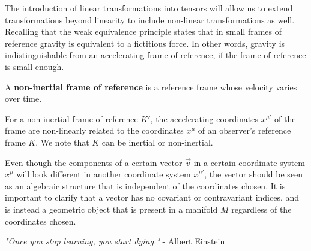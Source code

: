 \documentclass{article}
\begin{document}
 		The introduction of linear transformations into tensors will allow us to extend transformations beyond linearity to include non-linear transformations as well. Recalling that the weak equivalence principle states that in small frames of reference gravity is equivalent to a fictitious force. In other words, gravity is indistinguishable from an accelerating frame of reference, if the frame of reference is small enough.
 		\begin{defn}
 			A \textbf{non-inertial frame of reference} is a reference frame whose velocity varies over time.
 		\end{defn}
 		\begin{thm}
 			For a non-inertial frame of reference $K'$, the accelerating coordinates $x^{\mu'}$ of the frame are non-linearly related to the coordinates $x^\mu$ of an observer's reference frame $K$. We note that $K$ can be inertial or non-inertial.
 		\end{thm}
 		Even though the components of a certain vector $\vec{v}$ in a certain coordinate system $x^\mu$ will look different in another coordinate system $x^{\mu'}$, the vector should be seen as an algebraic structure that is independent of the coordinates chosen. It is important to clarify that a vector has no covariant or contravariant indices, and is instead a geometric object that is present in a manifold $M$ regardless of the coordinates chosen.
 		\vfill
 		\begin{center}
 			\textit{"Once you stop learning, you start dying."} - Albert Einstein
 		\end{center}
 		\vfill
 		\pagebreak
\end{document}
